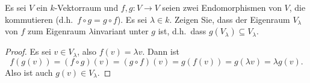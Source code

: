 \begin{question}
 Es sei $V$ ein $k$-Vektorraum und $f, g \colon V \to V$ seien zwei Endomorphismen von $V$, die kommutieren (d.h.\ $f \circ g = g \circ f$). Es sei $\lambda \in k$. Zeigen Sie, dass der Eigenraum $V_\lambda$ von $f$ zum Eigenraum $\lambda$invariant unter $g$ ist, d.h.\ dass $g(V_\lambda) \subseteq V_\lambda$.
\end{question}
\begin{proof}
 Es sei $v \in V_\lambda$, also $f(v) = \lambda v$. Dann ist
 \[
  f(g(v)) = (f \circ g)(v) = (g \circ f)(v) = g(f(v)) = g(\lambda v) = \lambda g(v).
 \]
 Also ist auch $g(v) \in V_\lambda$.
\end{proof}







